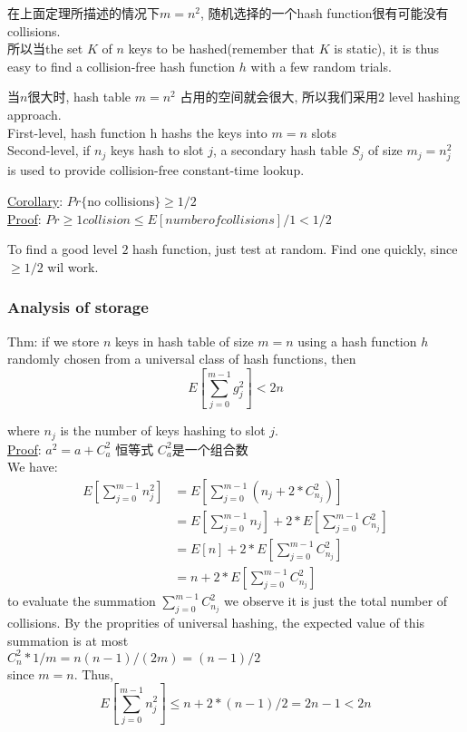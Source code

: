 \documentclass{article}
\begin{document}
在上面定理所描述的情况下$m=n^2$, 随机选择的一个hash function很有可能没有collisions.\\
所以当the set $K$ of $n$ keys to be hashed(remember that $K$ is static), it is thus easy to find a collision-free hash function $h$ with a few random trials.

当$n$很大时, hash table $m=n^2$ 占用的空间就会很大, 所以我们采用$2$ level hashing approach.\\
First-level, hash function h hashs the keys into $m=n$ slots\\
Second-level, if $n_j$ keys hash to slot $j$, a secondary hash table $S_j$ of size $m_j=n_j^2$ is used to provide collision-free constant-time lookup.

\underline{Corollary}: $Pr\{\text{no collisions}\} \geq 1/2$\\
\underline{Proof}: $Pr{\geq 1 collision} \leq E[number of collisions]/1 < 1/2$

To find a good level $2$ hash function, just test at random. Find one quickly, since $\geq 1/2$ wil work.

\subsubsection{Analysis of storage}
Thm: if we store $n$ keys in hash table of size $m=n$ using a hash function $h$ randomly chosen from a universal class of hash functions, then
$$
E[\sum_{j=0}^{m-1} g_j^2] < 2n
$$

where $n_j$ is the number of keys hashing to slot $j$.\\
\underline{Proof}: $a^2 = a + C_a^2$ 恒等式  $C_a^2$是一个组合数\\
We have:
$$
\begin{aligned}
E[\sum_{j=0}^{m-1} n_j^2]
&=E[\sum_{j=0}^{m-1} (n_j + 2*C_{n_j}^2)]\\
&=E[\sum_{j=0}^{m-1} n_j] + 2*E[\sum_{j=0}^{m-1} C_{n_j}^2]\\
&=E[n] + 2*E[\sum_{j=0}^{m-1} C_{n_j}^2]\\
&=n + 2*E[\sum_{j=0}^{m-1} C_{n_j}^2]
\end{aligned}
$$
to evaluate the summation $\sum_{j=0}^{m-1} C_{n_j}^2$ we observe it is just the total number of collisions. By the proprities of universal hashing, the expected value of this summation is at most\\
$C_n^2 * 1/m =n(n-1)/(2m)=(n-1)/2$\\
since $m=n$. Thus,
$$
E[\sum_{j=0}^{m-1} n_j^2]
\leq n + 2*(n-1)/2
=2n - 1
< 2n
$$
\end{document}
